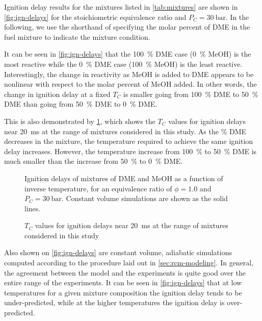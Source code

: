 \documentclass[12pt]{../ussci}
\begin{document}
Ignition delay results for the mixtures listed in \cref{tab:mixtures} are shown
in \cref{fig:ign-delays} for the stoichiometric equivalence ratio and \(P_C =
\SI{30}{\bar}\). In the following, we use the shorthand of specifying the molar
percent of DME in the fuel mixture to indicate the mixture condition.

It can be seen in \cref{fig:ign-delays} that the \SI{100}{\percent} DME case
(\SI{0}{\percent} MeOH) is the most reactive while the \SI{0}{\percent} DME case
(\SI{100}{\percent} MeOH) is the least reactive. Interestingly, the change in
reactivity as MeOH is added to DME appears to be nonlinear with respect to the
molar percent of MeOH added. In other words, the change in ignition delay at a
fixed \(T_C\) is smaller going from \SI{100}{\percent} DME to \SI{50}{\percent}
DME than going from \SI{50}{\percent} DME to \SI{0}{\percent} DME.

This is also demonstrated by \cref{fig:temp-comp}, which shows the \(T_C\)
values for ignition delays near \SI{20}{\ms} at the range of mixtures considered
in this study. As the \si{\percent} DME decreases in the mixture, the
temperature required to achieve the same ignition delay increases. However, the
temperature increase from \SI{100}{\percent} to \SI{50}{\percent} DME is much
smaller than the increase from \SI{50}{\percent} to \SI{0}{\percent} DME.

\begin{figure}[htb]
    \begin{minipage}[t]{0.48\textwidth}
        \centering
        \resizebox{\linewidth}{!}{}
        \caption{Ignition delays of mixtures of DME and MeOH as a function of
        inverse temperature, for an equivalence ratio of \(\phi = 1.0\) and
        \(P_C = \SI{30}{\bar}\). Constant volume simulations are shown as the
        solid lines.}
        \label{fig:ign-delays}
    \end{minipage}\hfill%
    \begin{minipage}[t]{0.48\textwidth}
        \centering
        \resizebox{\linewidth}{!}{}
        \caption{\(T_C\) values for ignition delays near \SI{20}{\ms} at the
        range of mixtures considered in this study}
        \label{fig:temp-comp}
    \end{minipage}\hfill%
\end{figure}

Also shown on \cref{fig:ign-delays} are constant volume, adiabatic simulations
computed according to the procedure laid out in \cref{sec:rcm-modeling}. In
general, the agreement between the model and the experiments is quite good over
the entire range of the experiments. It can be seen in \cref{fig:ign-delays}
that at low temperatures for a given mixture composition the ignition delay
tends to be under-predicted, while at the higher temperatures the ignition delay
is over-predicted.
\end{document}

